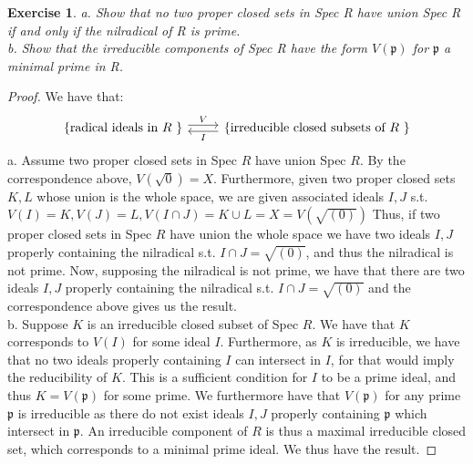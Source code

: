 \documentclass{article}
\newcommand{\fk}[1]{\mathfrak{#1}}
\newtheorem{exercise}{Exercise}
\begin{document}
\begin{exercise}
  a. Show that no two proper closed sets in Spec R have union Spec R if and only if the nilradical of R is prime. \\
  b. Show that the irreducible components of Spec R have the form $V(\fk{p})$ for $\fk{p}$ a minimal prime in R.
\end{exercise}
\begin{proof}
  We have that:
\[
\begin{tikzcd}
\text{\{radical ideals in $R$ \}} \arrow[r, "V", shift left] & \text{\{irreducible closed subsets of $R$ \}} \arrow[l, "I", shift left]
\end{tikzcd}
\]
  a. Assume two proper closed sets in Spec $R$ have union Spec $R$. By the correspondence above, $V(\sqrt{0}) = X$. Furthermore, given two proper closed sets $K,L$ whose union is the whole space, we are given associated ideals $I,J$ s.t. $V(I) = K, V(J) = L, V(I \cap J) = K \cup L = X = V(\sqrt{(0)})$ Thus, if two proper closed sets in Spec $R$ have union the whole space we have two ideals $I,J$ properly containing the nilradical s.t. $I \cap J = \sqrt{(0)}$, and thus the nilradical is not prime. Now, supposing the nilradical is not prime, we have that there are two ideals $I, J$ properly containing the nilradical s.t. $I \cap J = \sqrt{(0)}$ and the correspondence above gives us the result. \\
  b. Suppose $K$ is an irreducible closed subset of Spec $R$. We have that $K$ corresponds to $V(I)$ for some ideal $I$. Furthermore, as $K$ is irreducible, we have that no two ideals properly containing $I$ can intersect in $I$, for that would imply the reducibility of $K$. This is a sufficient condition for $I$ to be a prime ideal, and thus $K = V(\fk{p})$ for some prime. We furthermore have that $V(\fk{p})$ for any prime $\fk{p}$ is irreducible as there do not exist ideals $I,J$ properly containing $\fk{p}$ which intersect in $\fk{p}$. An irreducible component of $R$ is thus a maximal irreducible closed set, which corresponds to a minimal prime ideal. We thus have the result. 
\end{proof}
\end{document}
